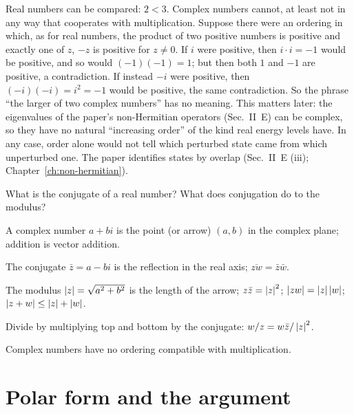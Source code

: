 Real numbers can be compared: $2<3$. Complex numbers cannot, at least not in any way that cooperates with multiplication. Suppose there were an ordering in which, as for real numbers, the product of two positive numbers is positive and exactly one of $z$, $-z$ is positive for $z\neq0$. If $i$ were positive, then $i\cdot i=-1$ would be positive, and so would $(-1)(-1)=1$; but then both $1$ and $-1$ are positive, a contradiction. If instead $-i$ were positive, then $(-i)(-i)=i^2=-1$ would be positive, the same contradiction. So the phrase ``the larger of two complex numbers'' has no meaning. This matters later: the eigenvalues of the paper's non-Hermitian operators (Sec.~II~E) can be complex, so they have no natural ``increasing order'' of the kind real energy levels have. In any case, order alone would not tell which perturbed state came from which unperturbed one. The paper identifies states by overlap (Sec.~II~E (iii); Chapter~\ref{ch:non-hermitian}).

\begin{checkpoint}
What is the conjugate of a real number? What does conjugation do to the modulus?
\end{checkpoint}

\begin{keyideas}
\item A complex number $a+bi$ is the point (or arrow) $(a,b)$ in the complex plane; addition is vector addition.
\item The conjugate $\bar z=a-bi$ is the reflection in the real axis; $\overline{zw}=\bar z\bar w$.
\item The modulus $\left\lvert z\right\rvert=\sqrt{a^2+b^2}$ is the length of the arrow; $z\bar z=\left\lvert z\right\rvert^2$; $\left\lvert zw\right\rvert=\left\lvert z\right\rvert\left\lvert w\right\rvert$; $\left\lvert z+w\right\rvert\le\left\lvert z\right\rvert+\left\lvert w\right\rvert$.
\item Divide by multiplying top and bottom by the conjugate: $w/z=w\bar z/\left\lvert z\right\rvert^2$.
\item Complex numbers have no ordering compatible with multiplication.
\end{keyideas}

\section{Polar form and the argument}\label{sec:complex-polar}

